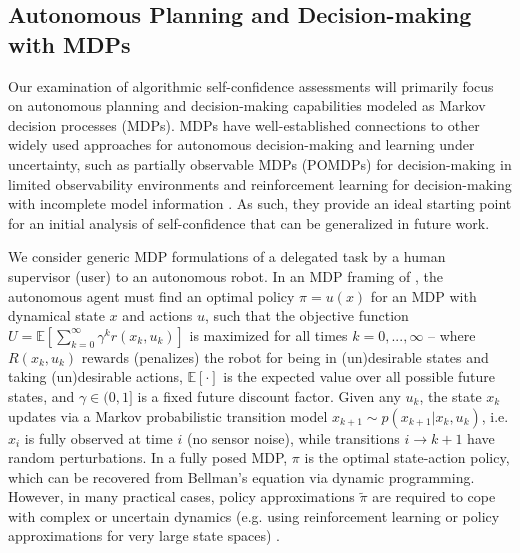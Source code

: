 \subsection{Autonomous Planning and Decision-making with MDPs} \label{sec:mdp}
Our examination of algorithmic self-confidence assessments will primarily focus on autonomous planning and decision-making capabilities modeled as Markov decision processes (MDPs). %
MDPs have well-established connections to other widely used approaches for autonomous decision-making and learning under uncertainty, such as partially observable MDPs (POMDPs) for decision-making in limited observability environments and reinforcement learning for decision-making with incomplete model information \cite{Kochenderfer2015-uu}. As such, they provide an ideal starting point for an initial analysis of self-confidence that can be generalized in future work. 

We consider generic MDP formulations of a delegated task \task{} by a human supervisor (user) to an autonomous robot. In an MDP framing of \task{}, the autonomous agent must find an optimal policy $\pi = u(x)$ for an MDP with dynamical state $x$ and actions $u$, such that the objective function
$U = \mathbb{E} \left[\sum_{k=0}^{\infty} \gamma^k r(x_k,u_k) \right]$ is maximized for all times $k=0,...,\infty$ --  
where $R(x_k,u_k)$ rewards (penalizes) the robot for being in (un)desirable states and taking (un)desirable actions, $\mathbb{E}[\cdot]$ is the expected value over all possible future states, and $\gamma \in (0,1]$ is a fixed future discount factor. 
Given any $u_k$, the state $x_k$ updates via a Markov probabilistic transition model $x_{k+1} \sim p(x_{k+1}|x_{k},u_{k})$,  
i.e. $x_{i}$ is fully observed at time $i$ (no sensor noise), while transitions $i\rightarrow k+1$ have random perturbations.
In a fully posed MDP, $\pi$ is the optimal state-action policy, which can be recovered from Bellman's equation via dynamic programming. 
However, in many practical cases, policy approximations $\tilde{\pi}$ are required to cope with complex or uncertain dynamics (e.g. using reinforcement learning or policy approximations for very large state spaces) \cite{Kochenderfer2015-uu}. 

